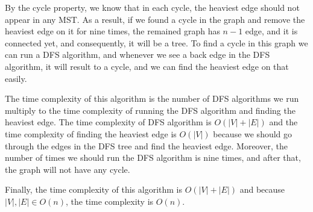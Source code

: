 \documentclass[12pt]{article}
\newenvironment{solution}[2][Solution]{\begin{trivlist}
\item[\hskip \labelsep {\bfseries #1}]}{\end{trivlist}}
\begin{document}
\begin{solution}{}
By the cycle property, we know that in each cycle, the heaviest edge should not appear
in any MST. As a result, if we found a cycle in the graph and remove the heaviest edge
on it for nine times, the remained graph has $n-1$ edge, and it is connected yet, and
consequently, it will be a tree. To find a cycle in this graph we can run a DFS algorithm,
and whenever we see a back edge in the DFS algorithm, it will result to a cycle, and we 
can find the heaviest edge on that easily. 

The time complexity of this algorithm is the number of DFS algorithms we run multiply to
the time complexity of running the DFS algorithm and finding the heaviest edge. The time
complexity of DFS algorithm is $O(|V| + |E|)$ and the time complexity of finding the 
heaviest edge is $O(|V|)$ because we should go through the edges in the DFS tree and
find the heaviest edge. Moreover, the number of times we should run the DFS algorithm
is nine times, and after that, the graph will not have any cycle. 

Finally, the time complexity of this algorithm is $O(|V|+|E|)$ and because $|V|,|E| \in
O(n)$, the time complexity is $O(n)$.
\end{solution}


\pagebreak
\end{document}
